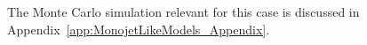 


% 


The Monte Carlo simulation relevant for
this case is discussed in Appendix~\ref{app:MonojetLikeModels_Appendix}.




